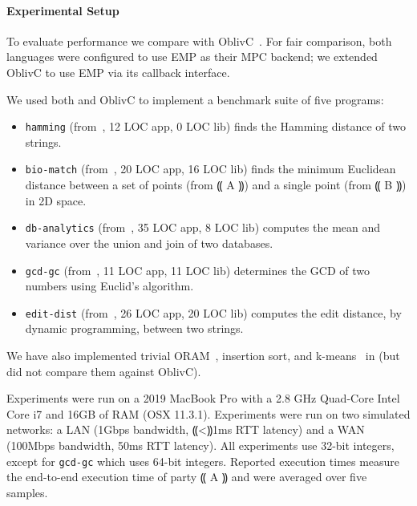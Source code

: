 \paragraph{Experimental Setup}

To evaluate performance we compare \system with
OblivC~\cite{cryptoeprint:2015:1153}.
For fair comparison, both languages were configured to use EMP as their
MPC backend; we extended OblivC to use EMP via its
callback interface.

We used both \system and OblivC to implement a benchmark suite of five
programs:
\begin{itemize}
  \item \texttt{hamming} (from~\cite{10.1007/978-3-642-54807-9_15, CCS:ZhaSteBla13}, 12 LOC app, 0 LOC lib) finds the Hamming distance of two strings.
  \item \texttt{bio-match} (from~\cite{CCS:BDKKS18}, 20
LOC app, 16 LOC lib) finds the minimum Euclidean distance between a set of points
(from ⸨ A ⸩) and a single point (from ⸨ B ⸩) in 2D space.
  \item \texttt{db-analytics} (from~\cite{CCS:BDKKS18}, 35 LOC app, 8 LOC lib) computes the mean
    and variance over the union and join of two databases.
  \item \texttt{gcd-gc} (from~\cite{10.1145/3319535.3339818}, 11 LOC app, 11 LOC lib) determines the GCD of two numbers using Euclid's algorithm.
  \item \texttt{edit-dist} (from~\cite{cryptoeprint:2015:1153}, 26 LOC app, 20 LOC lib) computes the edit distance, by dynamic
    programming, between two strings.
\end{itemize}
We have also implemented trivial ORAM~\cite{10.1145/2810103.2813634}, insertion sort, and k-means~\cite{CCS:BDKKS18} in \system (but did not compare them against OblivC).

Experiments were run on a 2019 MacBook Pro with a 2.8 GHz Quad-Core
Intel Core i7 and 16GB of RAM (OSX 11.3.1).
Experiments were run on two simulated networks:
a LAN (1Gbps bandwidth, ⸨<⸩1ms RTT latency) and a WAN (100Mbps bandwidth, 50ms RTT latency).
All experiments use 32-bit integers, except for \texttt{gcd-gc}
which uses 64-bit integers.
Reported execution times measure the end-to-end execution time of party ⸨ A ⸩ and were averaged over five samples.

